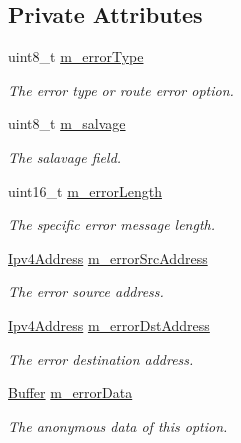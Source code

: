 \subsection*{Private Attributes}
\begin{DoxyCompactItemize}
\item 
uint8\+\_\+t \hyperlink{classns3_1_1dsr_1_1DsrOptionRerrHeader_adc5bfd05223715cbd597895e780713ad}{m\+\_\+error\+Type}
\begin{DoxyCompactList}\small\item\em The error type or route error option. \end{DoxyCompactList}\item 
uint8\+\_\+t \hyperlink{classns3_1_1dsr_1_1DsrOptionRerrHeader_a7c1d8a0c2f132911439b0f9be6ff4b4d}{m\+\_\+salvage}
\begin{DoxyCompactList}\small\item\em The salavage field. \end{DoxyCompactList}\item 
uint16\+\_\+t \hyperlink{classns3_1_1dsr_1_1DsrOptionRerrHeader_adc10cc82d68372b38d14f55bb21210d9}{m\+\_\+error\+Length}
\begin{DoxyCompactList}\small\item\em The specific error message length. \end{DoxyCompactList}\item 
\hyperlink{classns3_1_1Ipv4Address}{Ipv4\+Address} \hyperlink{classns3_1_1dsr_1_1DsrOptionRerrHeader_a48c0d4c518700042672018fa3c76c569}{m\+\_\+error\+Src\+Address}
\begin{DoxyCompactList}\small\item\em The error source address. \end{DoxyCompactList}\item 
\hyperlink{classns3_1_1Ipv4Address}{Ipv4\+Address} \hyperlink{classns3_1_1dsr_1_1DsrOptionRerrHeader_acb476b9a9977b9a10cf19a5934c166c8}{m\+\_\+error\+Dst\+Address}
\begin{DoxyCompactList}\small\item\em The error destination address. \end{DoxyCompactList}\item 
\hyperlink{classns3_1_1Buffer}{Buffer} \hyperlink{classns3_1_1dsr_1_1DsrOptionRerrHeader_a11a78d5a088996b6e340ac572875e12b}{m\+\_\+error\+Data}
\begin{DoxyCompactList}\small\item\em The anonymous data of this option. \end{DoxyCompactList}\end{DoxyCompactItemize}
